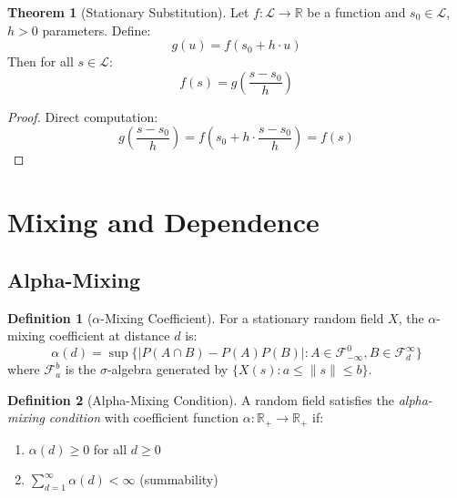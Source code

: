 \documentclass[11pt,a4paper]{article}
\theoremstyle{definition}
\newtheorem{definition}{Definition}[section]
\newtheorem{theorem}{Theorem}[section]
\begin{document}
\begin{theorem}[Stationary Substitution]
Let $f: \mathcal{L} \to \mathbb{R}$ be a function and $s_0 \in \mathcal{L}$, $h > 0$ parameters. Define:
\begin{equation}
g(u) = f(s_0 + h \cdot u)
\end{equation}
Then for all $s \in \mathcal{L}$:
\begin{equation}
f(s) = g\left(\frac{s - s_0}{h}\right)
\end{equation}
\end{theorem}

\begin{proof}
Direct computation:
\begin{equation}
g\left(\frac{s - s_0}{h}\right) = f\left(s_0 + h \cdot \frac{s - s_0}{h}\right) = f(s)
\end{equation}
\end{proof}

\section{Mixing and Dependence}

\subsection{Alpha-Mixing}

\begin{definition}[$\alpha$-Mixing Coefficient]
For a stationary random field $X$, the $\alpha$-mixing coefficient at distance $d$ is:
\begin{equation}
\alpha(d) = \sup \{|P(A \cap B) - P(A)P(B)| : A \in \mathcal{F}_{-\infty}^0, B \in \mathcal{F}_d^{\infty}\}
\end{equation}
where $\mathcal{F}_a^b$ is the $\sigma$-algebra generated by $\{X(s) : a \leq \|s\| \leq b\}$.
\end{definition}

\begin{definition}[Alpha-Mixing Condition]
A random field satisfies the \emph{alpha-mixing condition} with coefficient function $\alpha: \mathbb{R}_+ \to \mathbb{R}_+$ if:
\begin{enumerate}
    \item $\alpha(d) \geq 0$ for all $d \geq 0$
    \item $\sum_{d=1}^{\infty} \alpha(d) < \infty$ (summability)
\end{enumerate}
\end{definition}
\end{document}
